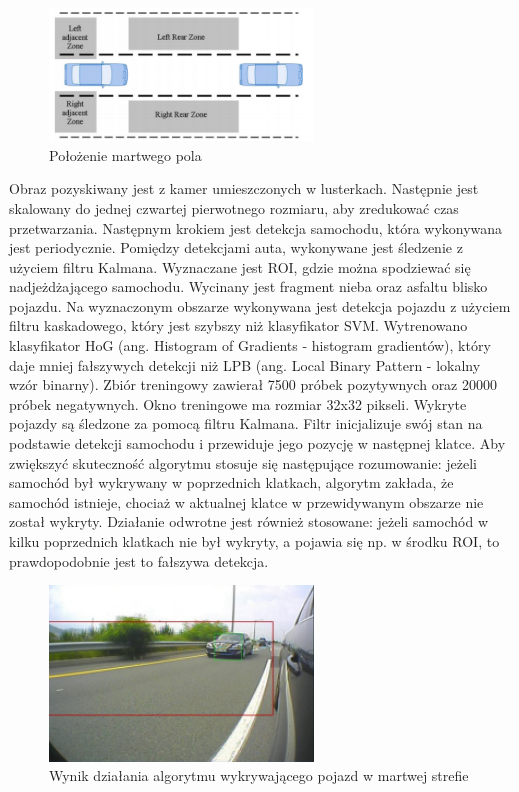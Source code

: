 \begin{figure}
  \centering
  \includegraphics[width=7cm]{img/car_detection2_blind_spot.png}
  \caption{Położenie martwego pola\cite{T11}}
  \label{fig:car_detection2_blind_spot2}
\end{figure}

Obraz pozyskiwany jest z kamer umieszczonych w lusterkach. Następnie jest skalowany do jednej czwartej pierwotnego rozmiaru, aby zredukować czas przetwarzania. 
Następnym krokiem jest detekcja samochodu, która wykonywana jest periodycznie. Pomiędzy detekcjami auta, wykonywane jest śledzenie z użyciem filtru Kalmana. 
Wyznaczane jest ROI, gdzie można spodziewać się nadjeżdżającego samochodu. Wycinany jest fragment nieba oraz asfaltu blisko pojazdu.
Na wyznaczonym obszarze wykonywana jest detekcja pojazdu z użyciem filtru kaskadowego, który jest szybszy niż klasyfikator SVM.
Wytrenowano klasyfikator HoG (ang. Histogram of Gradients - histogram gradientów), który daje mniej fałszywych detekcji niż LPB (ang. Local Binary Pattern - lokalny wzór binarny).
Zbiór treningowy zawierał 7500 próbek pozytywnych oraz 20000 próbek negatywnych. Okno treningowe ma rozmiar 32x32 pikseli. Wykryte pojazdy są śledzone za pomocą filtru Kalmana. Filtr inicjalizuje swój stan na podstawie detekcji samochodu i przewiduje jego pozycję w następnej klatce.
Aby zwiększyć skuteczność algorytmu stosuje się następujące rozumowanie: jeżeli samochód był wykrywany w poprzednich klatkach, algorytm zakłada, że samochód istnieje, chociaż w aktualnej klatce w przewidywanym obszarze nie został wykryty. Działanie odwrotne jest również stosowane: jeżeli samochód w kilku poprzednich klatkach nie był wykryty, a pojawia się np. w środku ROI, to prawdopodobnie jest to fałszywa detekcja. 

\begin{figure}
  \centering
  \includegraphics[width=7cm]{img/car_detection2_result.png}
  \caption{Wynik działania algorytmu wykrywającego pojazd w martwej strefie\cite{T11}}
  \label{fig:car_detection2_result}
\end{figure}

